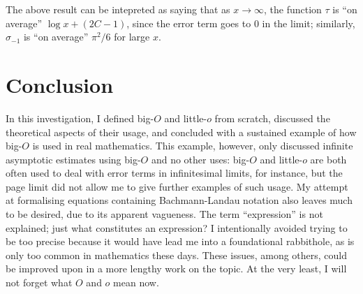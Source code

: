 \documentclass{article}
\theoremstyle{definition}
\begin{document}
The above result can be intepreted as saying that as \(x\to\infty\), the function \(\tau\) is ``on average'' \(\log x + (2C-1)\), since the error term goes to \(0\) in the limit;
similarly, \(\sigma_{-1}\) is ``on average'' \(\pi^2/6\) for large \(x\).

\section{Conclusion}\label{ssec:conclusion}

In this investigation, I defined big-$O$ and little-$o$ from scratch, discussed the theoretical aspects of their usage, and concluded with a sustained example of how big-$O$ is used in real mathematics.
This example, however, only discussed infinite asymptotic estimates using big-$O$ and no other uses: big-$O$ and little-$o$ are both often used to deal with error terms in infinitesimal limits, for instance, but the page limit did not allow me to give further examples of such usage.
My attempt at formalising equations containing Bachmann-Landau notation also leaves much to be desired, due to its apparent vagueness.
The term ``expression'' is not explained; just what constitutes an expression?
I intentionally avoided trying to be too precise because it would have lead me into a foundational rabbithole, as is only too common in mathematics these days.
These issues, among others, could be improved upon in a more lengthy work on the topic.
At the very least, I will not forget what \(O\) and \(o\) mean now.

\nocite{*}
\printbibliography
\end{document}
